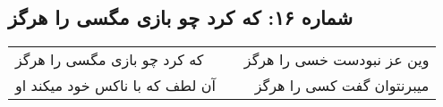\begin{center}
\section*{شماره ۱۶: که کرد چو بازی مگسی را هرگز}
\label{sec:016}
\begin{longtable}{l p{0.5cm} r}
که کرد چو بازی مگسی را هرگز
&&
وین عز نبودست خسی را هرگز
\\
آن لطف که با ناکس خود میکند او
&&
میبرنتوان گفت کسی را هرگز
\\
\end{longtable}
\end{center}
